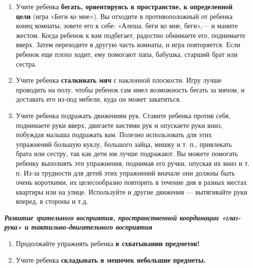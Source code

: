\documentclass[a5paper]{book}
\renewcommand{\emph}[1]{\textit{#1}}
\begin{document}
\begin{enumerate}
\def\labelenumi{\arabic{enumi}.}
\setcounter{enumi}{2}
\item
  
  Учите ребенка \textbf{бегать, ориентируясь в пространстве, к
  определенной цели} (игра «Беги ко мне»). Вы отходите в противоположный
  от ребенка конец комнаты, зовете его к себе: «Алеша, беги ко мне,
  беги»,--- и маните жестом. Когда ребенок к вам подбегает, радостно
  обнимаете его, поднимаете вверх. Затем переходите в другую часть
  комнаты, и игра повторяется. Если ребенок еще плохо ходит, ему
  помогают папа, бабушка, старший брат или сестра.
  
\item
  
  Учите ребенка \textbf{сталкивать мяч} с наклонной плоскости. Игру
  лучше проводить на полу, чтобы ребенок сам имел возможность бегать за
  мячом, и доставать его из-под мебели, куда он может закатиться.
  
\item
  
  Учите ребенка подражать движениям рук. Ставите ребенка против себя,
  поднимаете руки вверх, двигаете кистями рук и опускаете руки вниз,
  побуждая малыша подражать вам. Полезно использовать для этих
  упражнений большую куклу, большого зайца, мишку и т. п., привлекать
  брата или сестру, так как дети им лучше подражают. Вы можете помогать
  ребенку выполнять эти упражнения, поднимая его ручки, опуская их вниз
  и т. п. Из-за трудности для детей этих упражнений вначале они должны
  быть очень короткими, их целесообразно повторять в течение дня в
  разных местах квартиры или на улице. Используйте и другие движения ---
  вытягивайте руки вперед, в стороны и т.д.
  
\end{enumerate}


\emph{\textbf{Развитие зрительного восприятия, пространственной
координации «глаз-рука» и тактильно-двигательного восприятия}}


\begin{enumerate}
\def\labelenumi{\arabic{enumi}.}
\item
  
  Продолжайте упражнять ребенка \textbf{в схватывании предметов!}
  
\item
  
  Учите ребенка \textbf{складывать в мешочек небольшие предметы.}
  
\end{enumerate}
\end{document}
